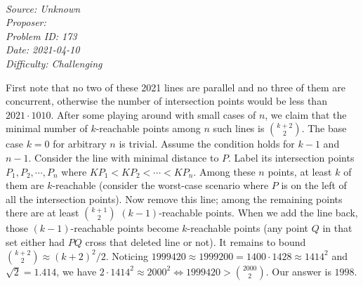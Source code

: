 \SSbreak\\
\emph{Source: Unknown}\\
\emph{Proposer: \Paiya}\\ %
\emph{Problem ID: 173}\\
\emph{Date: 2021-04-10}\\
\emph{Difficulty: Challenging}\\
\SSbreak

\bigskip

\begin{solution}\hfil\medskip
    
    First note that no two of these 2021 lines are parallel and no three of them are concurrent, otherwise the number of intersection points
    would be less than $2021 \cdot 1010$. After some playing around with small cases of $n$, we claim that the minimal number of $k$-reachable points among $n$ such lines is $\binom{k + 2}{2}$. 
    The base case $k = 0$ for arbitrary $n$ is trivial. Assume the condition holds for $k - 1$ and $n - 1$. 
    Consider the line with minimal distance to $P$. Label its intersection points $P_1, P_2, \cdots , P_n$ where $KP_1 < KP_2 < \cdots < KP_n$. 
    Among these $n$ points, at least $k$ of them are $k$-reachable (consider the worst-case scenario where $P$ is on the left of all the intersection points).
    Now remove this line; among the remaining points there are at least $\binom{k + 1}{2}$ $(k - 1)$-reachable points. 
    When we add the line back, those $(k - 1)$-reachable points become $k$-reachable points (any point $Q$ in that set either had $PQ$ cross that deleted line or not).
    It remains to bound $\binom{k + 2}{2} \approx (k + 2)^2/2$. Noticing $1999420 \approx 1999200 = 1400 \cdot 1428 \approx 1414^2$ and $\sqrt{2} = 1.414$, we have
    $2 \cdot 1414^2 \approx 2000^2 \iff 1999420 > \binom{2000}{2}$. Our answer is $\boxed{1998}$. 
\end{solution}\bigskip